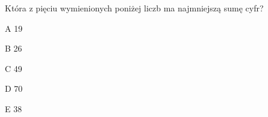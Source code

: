 \begin{tresc}
Która z pięciu wymienionych poniżej liczb ma najmniejszą sumę cyfr?
\end{tresc}
\begin{wariant}{A} 19 \end{wariant}
\begin{wariant}{B} 26 \end{wariant}
\begin{wariant}{C} 49 \end{wariant}
\begin{wariant}{D} 70 \end{wariant}
\begin{wariant}{E} 38 \end{wariant}
